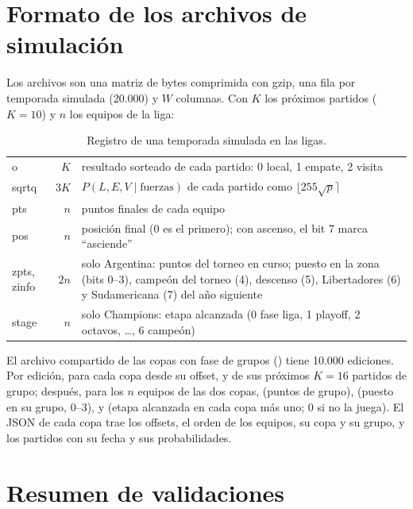 \chapter{Formato de los archivos de simulación}
\label{ap:formato}

Los archivos  son una matriz de bytes comprimida con gzip, una fila por temporada simulada (20.000) y $W$ columnas. Con $K$ los próximos partidos ($K=10$) y $n$ los equipos de la liga:

\begin{table}[h]
\centering
\caption{Registro de una temporada simulada en las ligas.}
\label{tab:formato}
\small
\begin{tabularx}{\textwidth}{@{}>{\ttfamily\small}p{2.6cm}rL@{}}
\toprule
{} &  &  \\
\midrule
o & $K$ & resultado sorteado de cada partido: 0 local, 1 empate, 2 visita \\
sqrtq & $3K$ & $P(L,E,V\mid\text{fuerzas})$ de cada partido como $\lfloor255\sqrt p\rceil$ \\
pts & $n$ & puntos finales de cada equipo \\
pos & $n$ & posición final (0 es el primero); con ascenso, el bit 7 marca ``asciende'' \\
zpts, zinfo & $2n$ & solo Argentina: puntos del torneo en curso; puesto en la zona (bits 0--3), campeón del torneo (4), descenso (5), Libertadores (6) y Sudamericana (7) del año siguiente \\
stage & $n$ & solo Champions: etapa alcanzada (0 fase liga, 1 playoff, 2 octavos, \dots, 6 campeón) \\
\bottomrule
\end{tabularx}
\end{table}

El archivo compartido de las copas con fase de grupos () tiene 10.000 ediciones. Por edición, para cada copa desde su offset,  y  de sus próximos $K=16$ partidos de grupo; después, para los $n$ equipos de las dos copas,  (puntos de grupo),  (puesto en su grupo, 0--3),  y  (etapa alcanzada en cada copa más uno; 0 si no la juega). El JSON de cada copa trae los offsets, el orden de los equipos, su copa y su grupo, y los partidos con su fecha y sus probabilidades.

\chapter{Resumen de validaciones}
\label{ap:validaciones}

